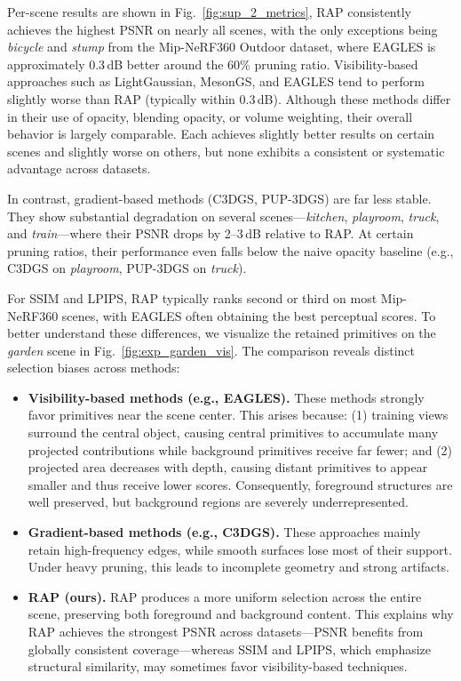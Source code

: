 Per-scene results are shown in Fig.~\ref{fig:sup_2_metrics}, RAP consistently achieves the highest PSNR on nearly all scenes, with the only exceptions being \textit{bicycle} and \textit{stump} from the Mip-NeRF360 Outdoor dataset, where EAGLES is approximately 0.3\,dB better around the 60\% pruning ratio. 
Visibility-based approaches such as LightGaussian, MesonGS, and EAGLES tend to perform slightly worse than RAP (typically within 0.3\,dB). 
Although these methods differ in their use of opacity, blending opacity, or volume weighting, their overall behavior is largely comparable. Each achieves slightly better results on certain scenes and slightly worse on others, but none exhibits a consistent or systematic advantage across datasets.

In contrast, gradient-based methods (C3DGS, PUP-3DGS) are far less stable. 
They show substantial degradation on several scenes---\textit{kitchen}, \textit{playroom}, \textit{truck}, and \textit{train}---where their PSNR drops by 2--3\,dB relative to RAP. 
At certain pruning ratios, their performance even falls below the naive opacity baseline (e.g., C3DGS on \textit{playroom}, PUP-3DGS on \textit{truck}).

For SSIM and LPIPS, RAP typically ranks second or third on most Mip-NeRF360 scenes, with EAGLES often obtaining the best perceptual scores. 
To better understand these differences, we visualize the retained primitives on the \textit{garden} scene in Fig.~\ref{fig:exp_garden_vis}. 
The comparison reveals distinct selection biases across methods:
\begin{itemize}
    \item \textbf{Visibility-based methods (e.g., EAGLES).}
    These methods strongly favor primitives near the scene center. 
    This arises because: 
    (1) training views surround the central object, causing central primitives to accumulate many projected contributions while background primitives receive far fewer; and 
    (2) projected area decreases with depth, causing distant primitives to appear smaller and thus receive lower scores. 
    Consequently, foreground structures are well preserved, but background regions are severely underrepresented.
    \item \textbf{Gradient-based methods (e.g., C3DGS).}
    These approaches mainly retain high-frequency edges, while smooth surfaces lose most of their support. 
    Under heavy pruning, this leads to incomplete geometry and strong artifacts.
    \item \textbf{RAP (ours).}
    RAP produces a more uniform selection across the entire scene, preserving both foreground and background content. 
    This explains why RAP achieves the strongest PSNR across datasets---PSNR benefits from globally consistent coverage---whereas SSIM and LPIPS, which emphasize structural similarity, may sometimes favor visibility-based techniques.
\end{itemize}

